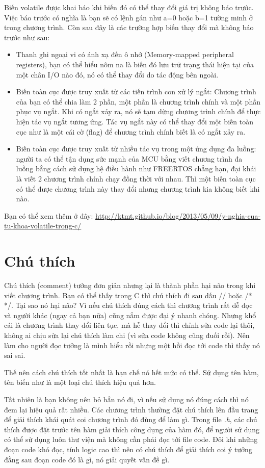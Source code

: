 Biến volatile được khai báo khi biến đó có thể thay đổi giá trị không báo trước. Việc báo trước có nghĩa là bạn sẽ có lệnh gán như a=0 hoặc b=1 tường minh ở trong chương trình. Còn sau đây là các trường hợp biến thay đổi mà không báo trước như sau:
\begin{itemize}
\item Thanh ghi ngoại vi có ánh xạ đến ô nhớ (Memory-mapped peripheral registers), bạn có thể hiểu nôm na là biến đó lưu trữ trạng thái hiện tại của một chân I/O nào đó, nó có thể thay đổi do tác động bên ngoài.
\item Biến toàn cục được truy xuất từ các tiến trình con xử lý ngắt: Chương trình của bạn có thể chia làm 2 phần, một phần là chương trình chính và một phần phục vụ ngắt. Khi có ngắt xảy ra, nó sẽ tạm dừng chương trình chính để thực hiện tác vụ ngắt tương ứng. Tác vụ ngắt này có thể thay đổi một biến toàn cục như là một cái cờ (flag) để chương trình chính biết là có ngắt xảy ra.
\item Biến toàn cục được truy xuất từ nhiều tác vụ trong một ứng dụng đa luồng: người ta có thể tận dụng sức mạnh của MCU bằng viết chương trình đa luồng bằng cách sử dụng hệ điều hành như FREERTOS chẳng hạn, đại khái là viết 2 chương trình chính chạy đồng thời với nhau. Thì một biến toàn cục có thể được chương trình này thay đổi nhưng chương trình kia không biết khi nào.
\end{itemize}

Bạn có thể xem thêm ở đây: \url{http://ktmt.github.io/blog/2013/05/09/y-nghia-cua-tu-khoa-volatile-trong-c/}
\section{Chú thích}

Chú thích (comment) tưởng đơn giản nhưng lại là thành phần hại não trong khi viết chương trình. Bạn có thể thấy trong C thì chú thích đi sau dấu // hoặc /* */. Tại sao nó hại não? Vì nếu chú thích đúng cách thì chương trình rất dễ đọc và người khác (ngay cả bạn nữa) cũng nắm được đại ý nhanh chóng. Nhưng khổ cái là chương trình thay đổi liên tục, mà hễ thay đổi thì chỉnh sửa code lại thôi, không ai chịu sửa lại chú thích làm chi (vì sửa code không cũng đuối rồi). Nên làm cho người đọc tưởng là mình hiểu rồi nhưng một hồi đọc tới code thì thấy nó sai sai.

Thế nên cách chú thích tốt nhất là hạn chế nó hết mức có thể. Sử dụng tên hàm, tên biến như là một loại chú thích hiệu quả hơn.

Tất nhiên là bạn không nên bỏ hẳn nó đi, vì nếu sử dụng nó đúng cách thì nó đem lại hiệu quả rất nhiều. Các chương trình thường đặt chú thích lên đầu trang để giải thích khái quát coi chương trình đó đùng để làm gì. Trong file \textit{.h}, các chú thích được đặt trước tên hàm giải thích công dụng của hàm đó, để người sử dụng có thể sử dụng luôn thư viện mà không cần phải đọc tới file code. Đôi khi những đoạn code khó đọc, tính logic cao thì nên có chú thích để giải thích coi ý tưởng đằng sau đoạn code đó là gì, nó giải quyết vấn đề gì.

